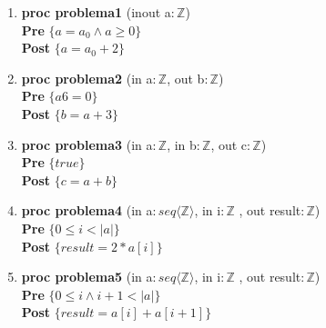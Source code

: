\documentclass{article}
\begin{document}
\begin{enumerate}[label=\alph*)]
\item \textbf{proc problema1 }(inout a$:\mathbb{Z}$) {\\
   \hspace*{6mm} \textbf{Pre }$\{a = a_0 \wedge a \geq 0\}$\\
   \hspace*{6mm} \textbf{Post }$\{a = a_0 + 2\}$\\
   }

\item \textbf{proc problema2 }(in a$:\mathbb{Z}$, out b$:\mathbb{Z}$) {\\
   \hspace*{6mm} \textbf{Pre }$\{a 6= 0\}$\\
   \hspace*{6mm} \textbf{Post }$\{b = a + 3\}$\\
   }

\item \textbf{proc problema3 }(in a$:\mathbb{Z}$, in b$:\mathbb{Z}$, out c$:\mathbb{Z}$) {\\
   \hspace*{6mm} \textbf{Pre }$\{true\}$\\
   \hspace*{6mm} \textbf{Post }$\{c = a + b\}$\\
   }

\item \textbf{proc problema4 }(in a$: seq\langle \mathbb{Z}\rangle$, in i$:\mathbb{Z}$
	, out result$: \mathbb{Z}$) {\\
   \hspace*{6mm} \textbf{Pre }$\{0 \leq i < |a|\}$\\
   \hspace*{6mm} \textbf{Post }$\{result = 2 * a[i]\}$\\
   }

\item \textbf{proc problema5 }(in a$: seq\langle \mathbb{Z}\rangle$, in i$:\mathbb{Z}$
	, out result$: \mathbb{Z}$) {\\
   \hspace*{6mm} \textbf{Pre }$\{0 \leq i \wedge i + 1 < |a|\}$\\
   \hspace*{6mm} \textbf{Post }$\{result = a[i] + a[i + 1]\}$\\
   }
\end{enumerate}
\end{document}
